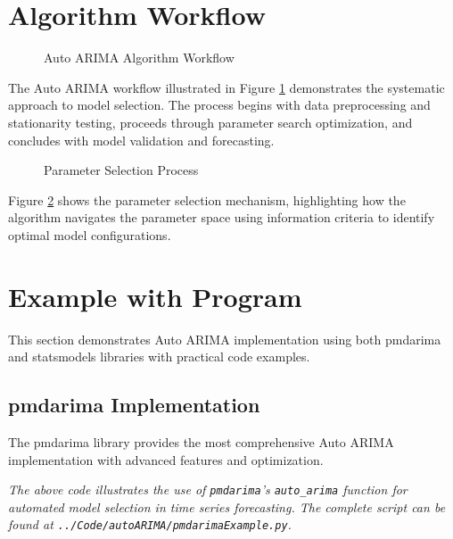 \section{Algorithm Workflow}
\label{sec:algorithm_workflow}

\begin{figure}[H]
	\centering
	
	\caption{Auto ARIMA Algorithm Workflow}
	\label{fig:algorithm_workflow}
\end{figure}

The Auto ARIMA workflow illustrated in Figure \ref{fig:algorithm_workflow} demonstrates the systematic approach to model selection. The process begins with data preprocessing and stationarity testing, proceeds through parameter search optimization, and concludes with model validation and forecasting.

\begin{figure}[H]
	\centering
	
	\caption{Parameter Selection Process}
	\label{fig:parameter_selection}
\end{figure}

Figure \ref{fig:parameter_selection} shows the parameter selection mechanism, highlighting how the algorithm navigates the parameter space using information criteria to identify optimal model configurations.

\section{Example with Program}
\label{sec:example_program}

This section demonstrates Auto ARIMA implementation using both pmdarima and statsmodels libraries with practical code examples.

\subsection{pmdarima Implementation}
\label{subsec:pmdarima_example}

The pmdarima library provides the most comprehensive Auto ARIMA implementation with advanced features and optimization.


\noindent\textit{The above code illustrates the use of \texttt{pmdarima}'s \texttt{auto\_arima} function for automated model selection in time series forecasting. The complete script can be found at \texttt{../Code/autoARIMA/pmdarimaExample.py}.}


